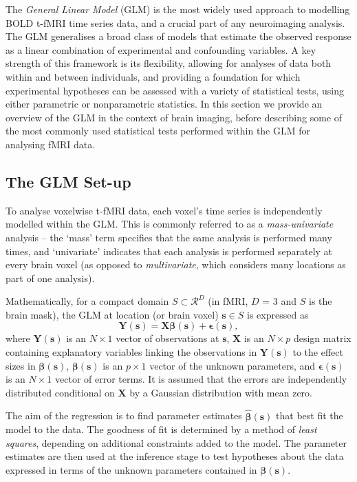 The \textit{General Linear Model} (GLM) is the most widely used approach to modelling BOLD t-fMRI time series data, and a crucial part of any neuroimaging analysis. The GLM generalises a broad class of models that estimate the observed response as a linear combination of experimental and confounding variables. A key strength of this framework is its flexibility, allowing for analyses of data both within and between individuals, and providing a foundation for which experimental hypotheses can be assessed with a variety of statistical tests, using either parametric or nonparametric statistics. In this section we provide an overview of the GLM in the context of brain imaging, before describing some of the most commonly used statistical tests performed within the GLM for analysing fMRI data.


\subsection{The GLM Set-up}
\label{sec:GLM}
To analyse voxelwise t-fMRI data, each voxel's time series is independently modelled within the GLM. This is commonly referred to as a \textit{mass-univariate} analysis -- the `mass' term specifies that the same analysis is performed many times, and `univariate' indicates that each analysis is performed separately at every brain voxel (as opposed to \textit{multivariate}, which considers many locations as part of one analysis). 

Mathematically, for a compact domain $S \subset \mathcal{R}^{D}$ (in fMRI, $D$ = 3 and $S$ is the brain mask), the GLM at location (or brain voxel) $\bm{s} \in S$ is expressed as
\begin{equation}
\label{eq:GLM}
\bm{Y}(\bm{s}) = \bm{X}\bm{\beta}(\bm{s}) + \bm{\epsilon}(\bm{s}),
\end{equation}
where $\bm{Y}(\bm{s})$ is an $N \times 1$ vector of observations at $\bm{s}$, $\bm{X}$ is an $N \times p$ design matrix containing explanatory variables linking the observations in $\bm{Y}(\bm{s})$ to the effect sizes in $\bm{\beta}(\bm{s})$, $\bm{\beta}(\bm{s})$ is an $p \times 1$ vector of the unknown parameters, and $\bm{\epsilon}(\bm{s})$ is an $N \times 1$ vector of error terms. It is assumed that the errors are independently distributed conditional on $\bm{X}$ by a Gaussian distribution with mean zero.

The aim of the regression is to find parameter estimates $\bm{\hat{\beta}}(\bm{s})$ that best fit the model to the data. The goodness of fit is determined by a method of \textit{least squares}, depending on additional constraints added to the model. The parameter estimates are then used at the inference stage to test hypotheses about the data expressed in terms of the unknown parameters contained in $\bm{\beta}(\bm{s})$.

